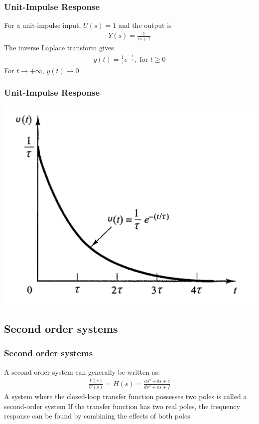 \begin{frame}
\frametitle{Unit-Impulse Response}
For a unit-impulse input, $U(s)=1$ and the output is
\vspace{0.15cm}
\begin{align*}
Y(s)=\frac{1}{\tau s +1}
\end{align*}
\vspace{0.15cm}
The inverse Laplace transform gives
\vspace{0.15cm}
\begin{align*}
y(t)= \frac{1}{\tau}e^{-\frac{t}{\tau}} ,\text{ for } t \ge 0
\end{align*}
\vspace{0.15cm}
For $t\rightarrow +\infty$, $y(t)\rightarrow 0$
\end{frame}

\begin{frame}
\frametitle{Unit-Impulse Response}
\includegraphics[width=0.8\linewidth]{Afbeelding5}
\end{frame}

\subsection{Second order systems} 

\begin{frame}
\frametitle{Second order systems}
A second order system can generally be written as:
\vspace{0.4cm}
\begin{align*}
\frac{Y(s)}{U(s)}=H(s)=\frac{as^2+ bs+ c}{ds^2+ es+ f}
\end{align*}
\vspace{0.2cm}
A system where the closed-loop transfer function possesses two poles is called a second-order system
\vspace{0.4cm}
If the transfer function has two real poles, the frequency response can be found by combining the effects of both poles
\end{frame}

